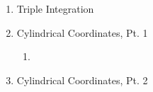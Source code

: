 \documentclass[11pt]{article}
\begin{document}
\begin{enumerate}[start=1,label={\bfseries Question \arabic*:},leftmargin=1in]
    \item Triple Integration
    
    \newpage
    \item Cylindrical Coordinates, Pt. 1
        \begin{enumerate}
            \item 
        \end{enumerate}

    \newpage
    \item Cylindrical Coordinates, Pt. 2

\end{enumerate}
\end{document}
